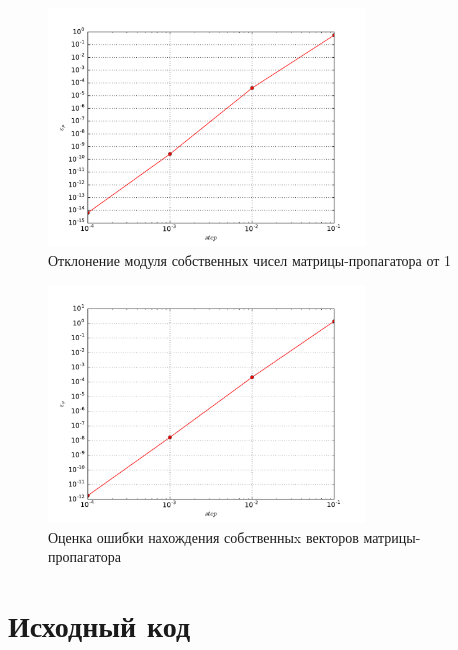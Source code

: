 \documentclass[a4paper]{article}
\begin{document}
\begin{figure}[H]
	\center
	\includegraphics[width=0.75\textwidth]{../pictures/lab5_eigvals_error.pdf}
	\caption{Отклонение модуля собственных чисел матрицы-пропагатора от 1}
	\label{fig:eigvals_error}
\end{figure}

\begin{figure}[H]
	\center
	\includegraphics[width=0.75\textwidth]{../pictures/lab5_eigvecs_error.pdf}
	\caption{Оценка ошибки нахождения собственныx векторов матрицы-пропагатора}
	\label{fig:eigvecs_error}
\end{figure}

\section{Исходный код}

\end{document}
